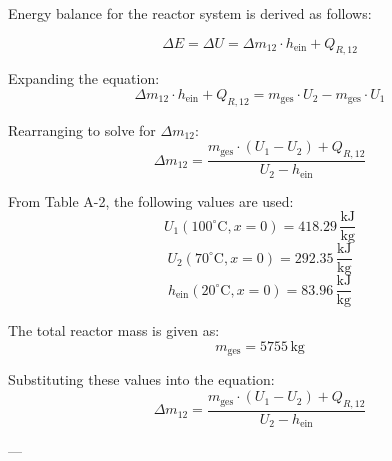 Energy balance for the reactor system is derived as follows:  

\[
\Delta E = \Delta U = \Delta m_{12} \cdot h_{\text{ein}} + Q_{R,12}
\]

Expanding the equation:  
\[
\Delta m_{12} \cdot h_{\text{ein}} + Q_{R,12} = m_{\text{ges}} \cdot U_2 - m_{\text{ges}} \cdot U_1
\]

Rearranging to solve for \( \Delta m_{12} \):  
\[
\Delta m_{12} = \frac{m_{\text{ges}} \cdot (U_1 - U_2) + Q_{R,12}}{U_2 - h_{\text{ein}}}
\]

From Table A-2, the following values are used:  
\[
U_1 (100^\circ\text{C}, x=0) = 418.29 \, \frac{\text{kJ}}{\text{kg}}
\]  
\[
U_2 (70^\circ\text{C}, x=0) = 292.35 \, \frac{\text{kJ}}{\text{kg}}
\]  
\[
h_{\text{ein}} (20^\circ\text{C}, x=0) = 83.96 \, \frac{\text{kJ}}{\text{kg}}
\]

The total reactor mass is given as:  
\[
m_{\text{ges}} = 5755 \, \text{kg}
\]

Substituting these values into the equation:  
\[
\Delta m_{12} = \frac{m_{\text{ges}} \cdot (U_1 - U_2) + Q_{R,12}}{U_2 - h_{\text{ein}}}
\]

---